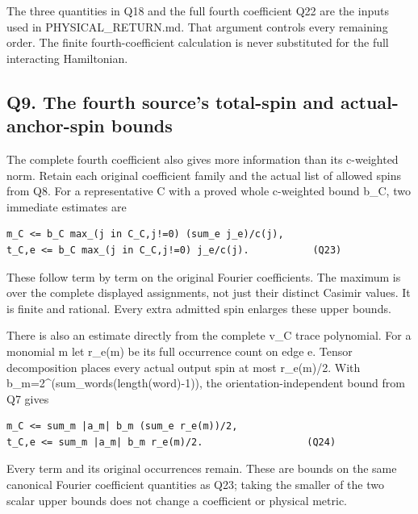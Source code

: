 \documentclass[11pt,a4paper]{article}
\renewcommand{\[}{\begingroup\small\originaldisplaystart}
\renewcommand{\]}{\originaldisplayend\endgroup}
\begin{document}
The three quantities in Q18 and the full fourth coefficient Q22 are the
inputs used in
{\ttfamily P\allowbreak{}H\allowbreak{}Y\allowbreak{}S\allowbreak{}I\allowbreak{}C\allowbreak{}A\allowbreak{}L\allowbreak{}\_\allowbreak{}R\allowbreak{}E\allowbreak{}T\allowbreak{}U\allowbreak{}R\allowbreak{}N\allowbreak{}.\allowbreak{}m\allowbreak{}d\allowbreak{}}.
That argument controls every remaining order. The finite
fourth-coefficient calculation is never substituted for the full
interacting Hamiltonian.

\subsection{Q9. The fourth source's total-spin and actual-anchor-spin
bounds}\label{q9.-the-fourth-sources-total-spin-and-actual-anchor-spin-bounds}

The complete fourth coefficient also gives more information than its
c-weighted norm. Retain each original coefficient family and the actual
list of allowed spins from Q8. For a representative C with a proved
whole c-weighted bound b\_C, two immediate estimates are

\begin{verbatim}
m_C <= b_C max_(j in C_C,j!=0) (sum_e j_e)/c(j),
t_C,e <= b_C max_(j in C_C,j!=0) j_e/c(j).           (Q23)
\end{verbatim}

These follow term by term on the original Fourier coefficients. The
maximum is over the complete displayed assignments, not just their
distinct Casimir values. It is finite and rational. Every extra admitted
spin enlarges these upper bounds.

There is also an estimate directly from the complete v\_C trace
polynomial. For a monomial m let r\_e(m) be its full occurrence count on
edge e. Tensor decomposition places every actual output spin at most
r\_e(m)/2. With b\_m=2\^{}(sum\_words(length(word)-1)), the
orientation-independent bound from Q7 gives

\begin{verbatim}
m_C <= sum_m |a_m| b_m (sum_e r_e(m))/2,
t_C,e <= sum_m |a_m| b_m r_e(m)/2.                  (Q24)
\end{verbatim}

Every term and its original occurrences remain. These are bounds on the
same canonical Fourier coefficient quantities as Q23; taking the smaller
of the two scalar upper bounds does not change a coefficient or physical
metric.
\end{document}
